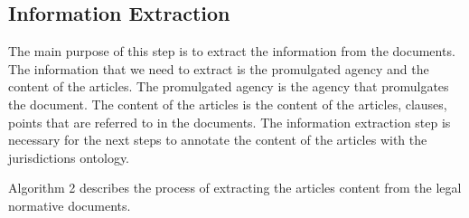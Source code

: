 
\subsection{Information Extraction}

    The main purpose of this step is to extract the information from the documents. The information that we need to extract is the promulgated agency and the content of the articles. The promulgated agency is the agency that promulgates the document. The content of the articles is the content of the articles, clauses, points that are referred to in the documents. The information extraction step is necessary for the next steps to annotate the content of the articles with the jurisdictions ontology.

    Algorithm 2 describes the process of extracting the articles content from the legal normative documents.

